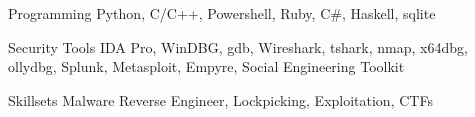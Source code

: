 


\begin{cvskills}


\cvskill
{Programming} %
{Python, C/C++, Powershell, Ruby, C#, Haskell, sqlite} %


\cvskill
{Security Tools} %
{IDA Pro, WinDBG, gdb, Wireshark, tshark, nmap, x64dbg, ollydbg, Splunk, Metasploit, Empyre, Social Engineering Toolkit} %


\cvskill
{Skillsets} %
{Malware Reverse Engineer, Lockpicking, Exploitation, CTFs} %


\end{cvskills}